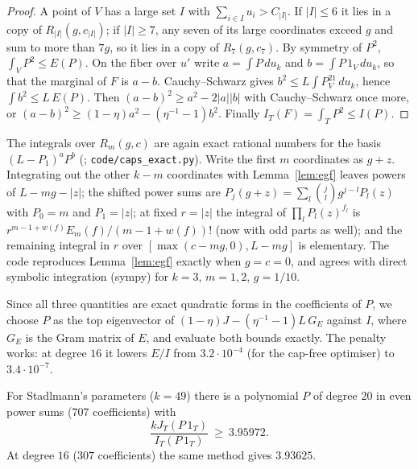 \begin{proof}
A point of $V$ has a large set $I$ with $\sum_{i\in I}u_i>C_{|I|}$. If
$|I|\le6$ it lies in a copy of $R_{|I|}(g,c_{|I|})$; if $|I|\ge7$, any seven
of its large coordinates exceed $g$ and sum to more than $7g$, so it lies in
a copy of $R_7(g,c_7)$. By symmetry of $P^2$, $\int_VP^2\le E(P)$. On the
fiber over $u'$ write $a=\int P\,du_k$ and $b=\int P\,1_V\,du_k$, so that the
marginal of $F$ is $a-b$. Cauchy--Schwarz gives $b^2\le L\int P^21_V\,du_k$,
hence $\int b^2\le L\,E(P)$. Then $(a-b)^2\ge a^2-2|a||b|$ with
Cauchy--Schwarz once more, or $(a-b)^2\ge(1-\eta)a^2-(\eta^{-1}-1)b^2$.
Finally $I_T(F)=\int_TP^2\le I(P)$.
\end{proof}

The integrals over $R_m(g,c)$ are again exact rational numbers for the basis
$(L-P_1)^aP^b$ (; \texttt{code/caps\_exact.py}). Write the
first $m$ coordinates as $g+z$. Integrating out the other $k-m$ coordinates
with Lemma~\ref{lem:egf} leaves powers of $L-mg-|z|$; the shifted power sums
are $P_j(g+z)=\sum_l\binom jlg^{j-l}P_l(z)$ with $P_0=m$ and $P_1=|z|$; at
fixed $r=|z|$ the integral of $\prod_lP_l(z)^{f_l}$ is
$r^{m-1+w(f)}E_m(f)/(m-1+w(f))!$ (now with odd parts as well); and the
remaining integral in $r$ over $[\max(c-mg,0),L-mg]$ is elementary. The code
reproduces Lemma~\ref{lem:egf} exactly when $g=c=0$, and agrees with direct
symbolic integration (sympy) for $k=3$, $m=1,2$, $g=1/10$.

Since all three quantities are exact quadratic forms in the coefficients of
$P$, we choose $P$ as the top eigenvector of
$(1-\eta)J-(\eta^{-1}-1)L\,G_E$ against $I$, where $G_E$ is the Gram matrix of
$E$, and evaluate both bounds exactly. The penalty works: at degree $16$ it
lowers $E/I$ from $3.2\cdot10^{-4}$ (for the cap-free optimiser) to
$3.4\cdot10^{-7}$.

\begin{proposition}\label{prop:capped}
For Stadlmann's parameters ($k=49$) there is a polynomial $P$ of degree $20$
in even power sums ($707$ coefficients) with
\[
\frac{kJ_T(P\,1_T)}{I_T(P\,1_T)}\ \ge\ 3.95972 .
\]
At degree $16$ ($307$ coefficients) the same method gives $3.93625$.
\end{proposition}

